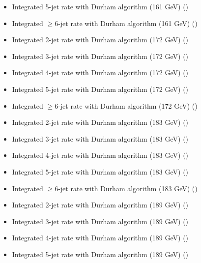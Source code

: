 \begin{itemize}
  \item Integrated 5-jet rate with Durham algorithm (161 GeV) ({\smaller {}})
  \item Integrated $\geq$6-jet rate with Durham algorithm (161 GeV) ({\smaller {}})
  \item Integrated 2-jet rate with Durham algorithm (172 GeV) ({\smaller {}})
  \item Integrated 3-jet rate with Durham algorithm (172 GeV) ({\smaller {}})
  \item Integrated 4-jet rate with Durham algorithm (172 GeV) ({\smaller {}})
  \item Integrated 5-jet rate with Durham algorithm (172 GeV) ({\smaller {}})
  \item Integrated $\geq$6-jet rate with Durham algorithm (172 GeV) ({\smaller {}})
  \item Integrated 2-jet rate with Durham algorithm (183 GeV) ({\smaller {}})
  \item Integrated 3-jet rate with Durham algorithm (183 GeV) ({\smaller {}})
  \item Integrated 4-jet rate with Durham algorithm (183 GeV) ({\smaller {}})
  \item Integrated 5-jet rate with Durham algorithm (183 GeV) ({\smaller {}})
  \item Integrated $\geq$6-jet rate with Durham algorithm (183 GeV) ({\smaller {}})
  \item Integrated 2-jet rate with Durham algorithm (189 GeV) ({\smaller {}})
  \item Integrated 3-jet rate with Durham algorithm (189 GeV) ({\smaller {}})
  \item Integrated 4-jet rate with Durham algorithm (189 GeV) ({\smaller {}})
  \item Integrated 5-jet rate with Durham algorithm (189 GeV) ({\smaller {}})

\end{itemize}
